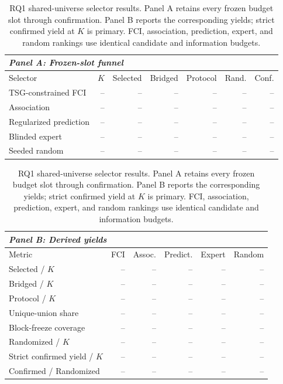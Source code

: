 \documentclass[acmsmall,screen,review,anonymous]{acmart}
\begin{document}
\begin{table}[H]
  \centering
  \small
  \caption{RQ1 shared-universe selector results. Panel A retains every frozen
  budget slot through confirmation. Panel B reports the corresponding yields;
  strict confirmed yield at $K$ is primary. FCI, association, prediction,
  expert, and random rankings use identical candidate and information
  budgets.}
  \label{tab:rq1}
  \begin{tabular}{lrrrrrr}
    \toprule
    \multicolumn{7}{l}{\textit{Panel A: Frozen-slot funnel}} \\
    \midrule
    Selector & $K$ & Selected & Bridged & Protocol & Rand. & Conf. \\
    \midrule
    TSG-constrained FCI & -- & -- & -- & -- & -- & -- \\
    Association & -- & -- & -- & -- & -- & -- \\
    Regularized prediction & -- & -- & -- & -- & -- & -- \\
    Blinded expert & -- & -- & -- & -- & -- & -- \\
    Seeded random & -- & -- & -- & -- & -- & -- \\
    \bottomrule
  \end{tabular}

  \medskip
  \begin{tabular}{lrrrrr}
    \toprule
    \multicolumn{6}{l}{\textit{Panel B: Derived yields}} \\
    \midrule
    Metric & FCI & Assoc. & Predict. & Expert & Random \\
    \midrule
    Selected / $K$ & -- & -- & -- & -- & -- \\
    Bridged / $K$ & -- & -- & -- & -- & -- \\
    Protocol / $K$ & -- & -- & -- & -- & -- \\
    Unique-union share & -- & -- & -- & -- & -- \\
    Block-freeze coverage & -- & -- & -- & -- & -- \\
    Randomized / $K$ & -- & -- & -- & -- & -- \\
    Strict confirmed yield / $K$ & -- & -- & -- & -- & -- \\
    Confirmed / Randomized & -- & -- & -- & -- & -- \\
    \bottomrule
  \end{tabular}
\end{table}
\end{document}
